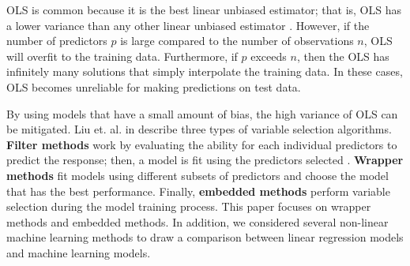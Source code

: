 \documentclass{article}
\begin{document}

	
	OLS is common because it is the best linear unbiased estimator; that is, OLS has a lower variance than any other linear unbiased estimator \cite{greene2003econometric, friedman2001elements}. However, if the number of predictors $p$ is large compared to the number of observations $n$, OLS will overfit to the training data. Furthermore, if $p$ exceeds $n$, then the OLS has infinitely many solutions that simply interpolate the training data. In these cases, OLS becomes unreliable for making predictions on test data.
	
	By using models that have a small amount of bias, the high variance of OLS can be mitigated. Liu et. al. in \cite{liu2020logsum} describe three types of variable selection algorithms. \textbf{Filter methods} work by evaluating the ability for each individual predictors to predict the response; then, a model is fit using the predictors selected \cite{sanchez2007filter, ding2005minimum}. \textbf{Wrapper methods} fit models using different subsets of predictors and choose the model that has the best performance. Finally, \textbf{embedded methods} perform variable selection during the model training process. This paper focuses on wrapper methods and embedded methods. In addition, we considered several non-linear machine learning methods to draw a comparison between linear regression models and machine learning models.
	
\end{document}
